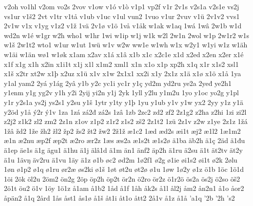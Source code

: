 v2oh
vo1hl
v2om
vo2s
2vov
v1ow
v1ó
v1ò
v1p1
vp2f
v1r
2v1s
v2s1a
v2s1e
vs2j
vs1ur
v1š2
2vt
v1tr
v1tå
v1ub
v1uc
v1ul
vun2
1vuo
v1ur
2vuv
v1ü
2v1v2
vvs1
2v1w
v1x
v1yg
v1z2
v1ž
1vä
2v1ø
v1ö
1vå
v1åk
w1ak
w1aq
1wá
1wâ
2w1b
w1d
wd2n
w1é
w1gr
w2h
who1
w1hr
1wi
w1ip
w1j
w1k
w2l
2w1n
2wol
w1p
2w1r2
w1s
w1š
2w1t2
wto1
w1ur
w1ut
1wü
w1v
w2w
ww1e
w1wh
w1x
w2y1
w1yi
w1z
w1äh
w1äi
w1än
wø1
w1øk
x1am
x2av
x1á
x1â
x1b
x1c
x2c1e
x1d
x2ed
x2en
x2er
x1é
x1f
x1g
x1h
x2in
x1i1t
x1j
x1l
x1m2
xml1
x1n
x1o
x1p
xp2h
x1q
x1r
x1s2
xsl1
x1š
x2tr
xt2w
x1þ
x2uz
x1ü
x1v
x1w
2x1x1
xx2i
x1y
2x1z
x1ä
x1ø
x1ö
x1å
1ya
y1al
yam2
2yá
y1ág
2yâ
y1b
y2c
yc1i
yc1r
y1ç
yd2m
yd2ru
ye2a
2yeđ
ye2h1
y1enm
y1g
yg2v
y1h
y2i
2yij
yi2n
y1j
2yk
1yll
y2lu
y1m2u
1yo
y1oc
yo2g
y1pl
y1r
y2s1a
ys2j
ys2s1
y2su
y1š
1ytr
y1ty
y1þ
1yu
y1ub
y1v
y1w
yx2
2yy
y1z
y1ä
y2öd
y1å
ý2r
ý1v
1za
1zá
zá2đ
zá2s
1zâ
1zb
2zc2
zd2
zf2
2z1g2
z2ha
z2hi
1zi
zi2l
z2j2
z1k2
zl2
zm2
2z1n
z1ov
z1p2
z1r2
z1s2
zš2
2z1t2
1zü
2z1v
z2w
z1ye
2z1z
1žá
1žâ
žd2
1že
žh2
žl2
žp2
žs2
žt2
žw2
2ž1ž
æ1c2
1æd
æd2s
æi1t
æj2
æ1l2
1æ1m2
æ1n
æ2nu
æp2f
æp2t
æ2ro
ær2z
1æs
æs2a
æ1s2t
æ1s2ø
ä1ba
äb2h
ä1ç
2äd
ä1đu
ä1ep
äe1s
ä1g
ägu1
ä1hu
ä1j
älâ1d
ä1m
än1
änf2
äp2h
ä1ru
ä2su
ä1t
ät2tv
ät2y
ä1u
1ävŋ
äv2ru
ä1vu
1äy
ä1z
ø1b
øc2
ød2m
1ø2f1
ø2g
ø1ie
øi1s2
øi1t
ø2k
2ølu
1øn
ø1p2
ø1q
ø1ru
ør2æ
øs2ki
ø1š
1øt
øt2u
øt2ø
ø1u
1øw
1ø2y
ø1z
ö1b
1öc
1ö1d
1öi
2ök
öl2u
2öm2
ön2g
2öp
öp2h
öp2t
ör2n
ö2ro
ör2z
ö1r2ö
ös2a
ös2j
ö2so
öš2
2ö1t
öu2
ö1v
1öy
1ö1z
å1am
å1b2
1åd
å1f
1åh
åk2s
å1l
ål2j
åm2
ån2n1
å1o
åor2
åpän2
å1q
2ård
1ås
åst1
ås1ø
å1š
åt1i
åt1o
ått2
2å1v
å1z
å1å
'a1q
'2b
'2h
's2
